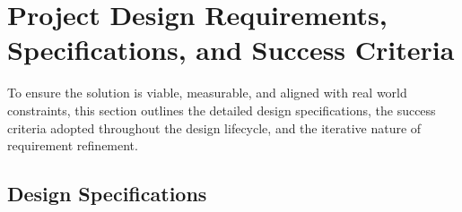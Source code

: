 \documentclass[12pt]{article}
\begin{document}
\section{Project Design Requirements, Specifications, and Success Criteria}


\par To ensure the solution is viable, measurable, and aligned with real world constraints, this section outlines the detailed design specifications, the success criteria adopted throughout the design lifecycle, and the iterative nature of requirement refinement.

\subsection{Design Specifications}
\end{document}

